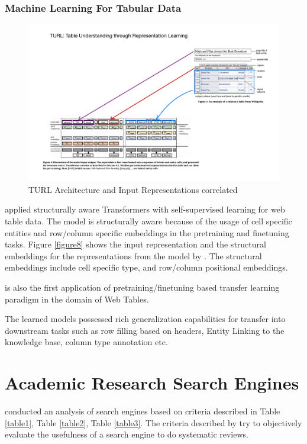 \subsubsection{Machine Learning For Tabular Data}
\begin{figure}[h]
    \centering
    \includegraphics[width=\maxwidth{\textwidth}]{src/images/TURL-model-exp.pdf}
    \caption{TURL Architecture and Input Representations correlated}
    \label{figure\arabic{figurecounter}}
\end{figure}
\cite{deng2020turl} applied structurally aware Transformers with self-supervised learning for web table data. The model is structurally aware because of the usage of cell specific entities and row/column specific embeddings in the pretraining and finetuning tasks. Figure \ref{figure8} shows the input representation and the structural embeddings for the representations from the model by \cite{deng2020turl}. The structural embeddings include cell specific type, and row/column positional embeddings. 

\cite{deng2020turl} is also the first application of pretraining/finetuning based transfer learning paradigm in the domain of Web Tables. 

The learned models possessed rich generalization capabilities for transfer into downstream tasks such as row filling based on headers, Entity Linking to the knowledge base, column type annotation etc. 


\section{Academic Research Search Engines}
\label{relatedwork:acad-search-engine}
\cite{gusenbauer2020academic} conducted an analysis of search engines based on criteria described in Table \ref{table1}, Table \ref{table2}, Table \ref{table3}.
The criteria described by \cite{gusenbauer2020academic} try to objectively evaluate the usefulness of a search engine to do systematic reviews.

